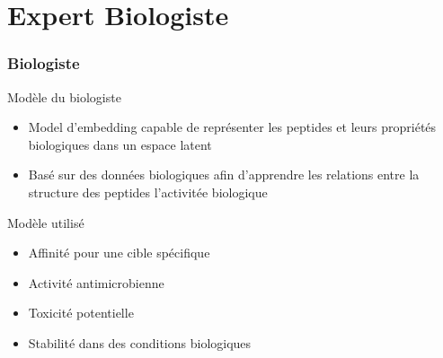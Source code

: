 \section{Expert Biologiste}
\begin{frame}
    \frametitle{Biologiste}
    \begin{block}{Modèle du biologiste}
        \begin{itemize}
        \item Model d'embedding capable de représenter les peptides et leurs propriétés biologiques dans un espace latent
        \item Basé sur des données biologiques afin d'apprendre les relations entre la structure des peptides l'activitée biologique
        \end{itemize}
    \end{block}
    \begin{block}{Modèle utilisé}
        \begin{itemize}
            \item Affinité pour une cible spécifique
            \item Activité antimicrobienne
            \item Toxicité potentielle
            \item Stabilité dans des conditions biologiques
        \end{itemize}
    \end{block}
\end{frame}
